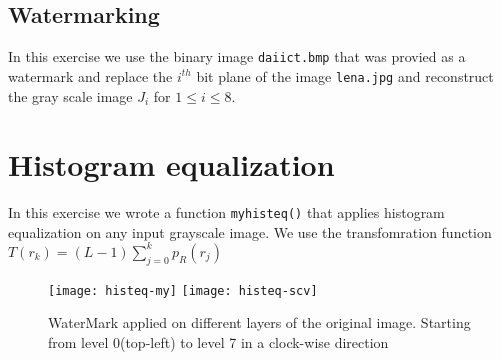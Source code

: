 \documentclass[paper=a4, fontsize=11pt]{scrartcl} %
\numberwithin{equation}{section} %
\numberwithin{figure}{section} %
\numberwithin{table}{section} %
\begin{document}

    \subsection{Watermarking}
    In this exercise we use the binary image \texttt{daiict.bmp} that was provied as a watermark and replace the \(i^{th}\) bit plane of the image \texttt{lena.jpg} and reconstruct the gray scale image \(J_i\) for \(1 \leq i \leq 8\).

\section{Histogram equalization}
    In this exercise we wrote a function \texttt{myhisteq()} that applies histogram equalization on any input grayscale image. 
    We use the transfomration function \\\(T(r_k) = (L-1)\sum_{j=0}^{k}p_R({r_j})\)

     \begin{figure}[h!]
        \centering
        \texttt{[image: histeq-my]}
        \texttt{[image: histeq-scv]}
        \caption{WaterMark applied on different layers of the original image. Starting from level 0(top-left) to level 7 in a clock-wise direction}
    \end{figure}

   
\end{document}
